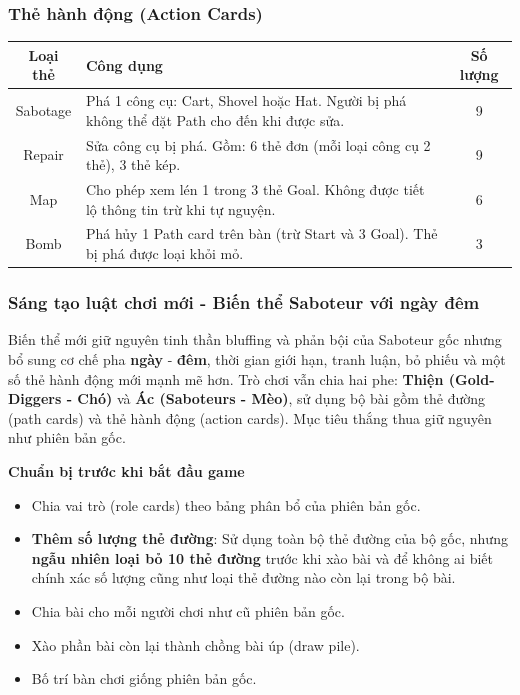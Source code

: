 \begin{frame}
\frametitle{Thẻ hành động (Action Cards)}

    \begin{table}[H]
    \centering
    \begin{tabular}{|c|p{7cm}|c|}
    \hline
    \textbf{Loại thẻ} & \textbf{Công dụng} & \textbf{Số lượng} \\ \hline
    Sabotage & Phá 1 công cụ: Cart, Shovel hoặc Hat. Người bị phá không thể đặt Path cho đến khi được sửa. & 9 \\ \hline
    Repair   & Sửa công cụ bị phá. Gồm: 6 thẻ đơn (mỗi loại công cụ 2 thẻ), 3 thẻ kép. & 9 \\ \hline
    Map      & Cho phép xem lén 1 trong 3 thẻ Goal. Không được tiết lộ thông tin trừ khi tự nguyện. & 6 \\ \hline
    Bomb & Phá hủy 1 Path card trên bàn (trừ Start và 3 Goal). Thẻ bị phá được loại khỏi mỏ. & 3 \\ \hline
    \end{tabular}
    \end{table}

\end{frame}



\begin{frame}
\frametitle{Sáng tạo luật chơi mới - Biến thể Saboteur với  ngày đêm}
Biến thể mới giữ nguyên tinh thần bluffing và phản bội của Saboteur gốc nhưng bổ sung cơ chế pha \textbf{ngày} - \textbf{đêm}, thời gian giới hạn, tranh luận, bỏ phiếu và một số thẻ hành động mới mạnh mẽ hơn. Trò chơi vẫn chia hai phe: \textbf{Thiện (Gold-Diggers - Chó)} và \textbf{Ác (Saboteurs - Mèo)}, sử dụng bộ bài gồm thẻ đường (path cards) và thẻ hành động (action cards). Mục tiêu thắng thua giữ nguyên như phiên bản gốc.

\textbf{Chuẩn bị trước khi bắt đầu game}
    \begin{itemize}
    \item Chia vai trò (role cards) theo bảng phân bổ của phiên bản gốc.
    \item \textbf{Thêm số lượng thẻ đường}: Sử dụng toàn bộ thẻ đường của bộ gốc, nhưng \textbf{ngẫu nhiên loại bỏ 10 thẻ đường} trước khi xào bài và để không ai biết chính xác số lượng cũng như loại thẻ đường nào còn lại trong bộ bài.
    \item Chia bài cho mỗi người chơi như cũ phiên bản gốc. 
    \item Xào phần bài còn lại thành chồng bài úp (draw pile).
    \item Bố trí bàn chơi giống phiên bản gốc.
\end{itemize}

\end{frame}

